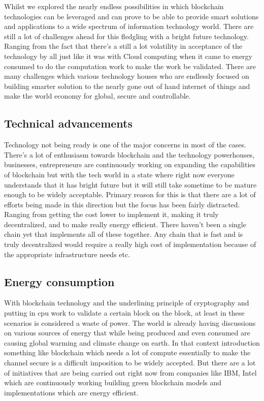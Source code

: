 Whilst we explored the nearly endless possibilities in which blockchain technologies can be leveraged and can prove to be able to provide smart solutions and applications to a wide spectrum of information technology world. There are still a lot of challenges ahead for this fledgling with a bright future technology. Ranging from the fact that there's a still a lot volatility in acceptance of the technology by all just like it was with Cloud computing when it came to energy consumed to do the computation work to make the work be validated. There are many challenges which various technology houses who are endlessly focused on building smarter solution to the nearly gone out of hand internet of things and make the world economy for global, secure and controllable.

\subsection{Technical advancements}

Technology not being ready is one of the major concerns in most of the cases. There's a lot of enthusiasm towards blockchain and the technology powerhouses, businesses, entrepreneurs are continuously working on expanding the capabilities of blockchain but with the tech world in a state where right now everyone understands that it has bright future but it will still take sometime to be mature enough to be widely acceptable. Primary reason for this is that there are a lot of efforts being made in this direction but the focus has been fairly distracted. Ranging from getting the cost lower to implement it, making it truly decentralized, and to make really energy efficient. There haven't been a single chain yet that implements all of these together. Any chain that is fast and is truly decentralized would require a really high cost of implementation because of the appropriate infrastructure needs etc.

\subsection{Energy consumption}

With blockchain technology and the underlining principle of cryptography and putting in cpu work to validate a certain block on the block, at least in these scenarios is considered a waste of power. The world is already having discussions on various sources of energy that while being produced and even consumed are causing global warming and climate change on earth. In that context introduction something like blockchain which needs a lot of compute essentially to make the channel secure is a difficult imposition to be widely accepted. But there are a lot of initiatives that are being carried out right now from companies like IBM, Intel which are continuously working building green blockchain models and implementations which are energy efficient.

